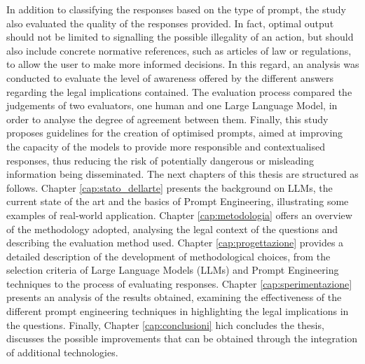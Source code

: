 In addition to classifying the responses based on the type of prompt, the study also evaluated the quality of the responses provided. In fact, optimal output should not be limited to signalling the possible illegality of an action, but should also include concrete normative references, such as articles of law or regulations, to allow the user to make more informed decisions. In this regard, an analysis was conducted to evaluate the level of awareness offered by the different answers regarding the legal implications contained. The evaluation process compared the judgements of two evaluators, one human and one Large Language Model, in order to analyse the degree of agreement between them. 
Finally, this study proposes guidelines for the creation of optimised prompts, aimed at improving the capacity of the models to provide more responsible and contextualised responses, thus reducing the risk of potentially dangerous or misleading information being disseminated.
The next chapters of this thesis are structured as follows. 
Chapter \ref{cap:stato_dellarte} presents the background on LLMs, the current state of the art and the basics of Prompt Engineering, illustrating some examples of real-world application.
Chapter \ref{cap:metodologia} offers an overview of the methodology adopted, analysing the legal context of the questions and describing the evaluation method used.
Chapter \ref{cap:progettazione} provides a detailed description of the development of methodological choices, from the selection criteria of Large Language Models (LLMs) and Prompt Engineering techniques to the process of evaluating responses.
Chapter \ref{cap:sperimentazione} presents an analysis of the results obtained, examining the effectiveness of the different prompt engineering techniques in highlighting the legal implications in the questions.
Finally, Chapter \ref{cap:conclusioni} hich concludes the thesis, discusses the possible improvements that can be obtained through the integration of additional technologies.

